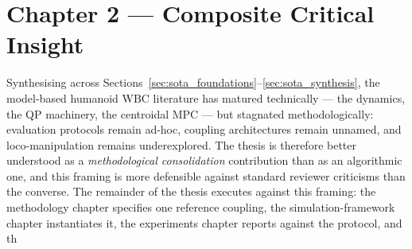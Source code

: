 \section*{Chapter 2 --- Composite Critical Insight}

Synthesising across Sections~\ref{sec:sota_foundations}--\ref{sec:sota_synthesis},
the model-based humanoid WBC literature has matured technically --- the
dynamics, the QP machinery, the centroidal MPC --- but stagnated
methodologically: evaluation protocols remain ad-hoc, coupling
architectures remain unnamed, and loco-manipulation remains
underexplored. The thesis is therefore better understood as a
\emph{methodological consolidation} contribution than as an algorithmic
one, and this framing is more defensible against standard reviewer
criticisms than the converse. The remainder of the thesis executes
against this framing: the methodology chapter specifies one reference
coupling, the simulation-framework chapter instantiates it, the
experiments chapter reports against the protocol, and th